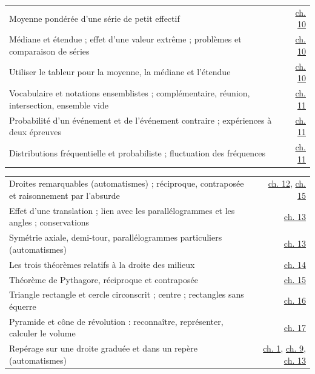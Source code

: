 \clearpage{}\fontsize{9.5}{12.5}\selectfont
{}\begin{tabularx}{\linewidth}{@{}Yr@{}}\toprule
Moyenne pondérée d’une série de petit effectif & \hyperref[chap-10]{ch. 10}\\[1.2mm]
Médiane et étendue ; effet d’une valeur extrême ; problèmes et comparaison de séries & \hyperref[chap-10]{ch. 10}\\[1.2mm]
Utiliser le tableur pour la moyenne, la médiane et l’étendue & \hyperref[chap-10]{ch. 10}\\[1.2mm]
Vocabulaire et notations ensemblistes ; complémentaire, réunion, intersection, ensemble vide & \hyperref[chap-11]{ch. 11}\\[1.2mm]
Probabilité d’un événement et de l’événement contraire ; expériences à deux épreuves & \hyperref[chap-11]{ch. 11}\\[1.2mm]
Distributions fréquentielle et probabiliste ; fluctuation des fréquences & \hyperref[chap-11]{ch. 11}\\[1.2mm]
\bottomrule\end{tabularx}\par\vspace{3mm}
\begin{tabularx}{\linewidth}{@{}Yr@{}}\toprule
Droites remarquables (automatismes) ; réciproque, contraposée et raisonnement par l’absurde & \hyperref[chap-12]{ch. 12}, \hyperref[chap-15]{ch. 15}\\[1.2mm]
Effet d’une translation ; lien avec les parallélogrammes et les angles ; conservations & \hyperref[chap-13]{ch. 13}\\[1.2mm]
Symétrie axiale, demi-tour, parallélogrammes particuliers (automatismes) & \hyperref[chap-13]{ch. 13}\\[1.2mm]
Les trois théorèmes relatifs à la droite des milieux & \hyperref[chap-14]{ch. 14}\\[1.2mm]
Théorème de Pythagore, réciproque et contraposée & \hyperref[chap-15]{ch. 15}\\[1.2mm]
Triangle rectangle et cercle circonscrit ; centre ; rectangles sans équerre & \hyperref[chap-16]{ch. 16}\\[1.2mm]
Pyramide et cône de révolution : reconnaître, représenter, calculer le volume & \hyperref[chap-17]{ch. 17}\\[1.2mm]
Repérage sur une droite graduée et dans un repère (automatismes) & \hyperref[chap-1]{ch. 1}, \hyperref[chap-9]{ch. 9}, \hyperref[chap-13]{ch. 13}\\[1.2mm]
\bottomrule\end{tabularx}\par\vspace{3mm}
